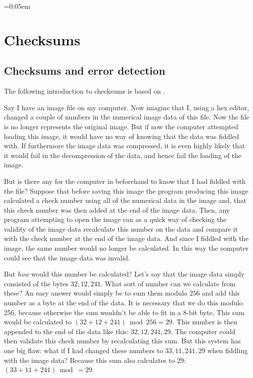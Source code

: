 \begin{comment}
  
\end{comment}

\begingroup
\arraycolsep=0.05em

\chapter{Checksums}
\label{cha:crc}

\section{Checksums and error detection}

The following introduction to checksums is based on
\cite{Williams_1993_crc_painless,barr:_addit_check,tanenbaum2003computernetworks_crc,Nelson:1992:FVU:135011.135017_crc32}.

Say I have an image file on my computer. Now imagine that I, using a
hex editor, changed a couple of numbers in the numerical image data of
this file. Now the file is no longer represents the original
image. But if now the computer attempted loading this image, it would
have no way of knowing that the data was fiddled with. If furthermore
the image data was compressed, it is even highly likely that it would
fail in the decompression of the data, and hence fail the loading of
the image.

But is there any for the computer in beforehand to know that I had
fiddled with the file? Suppose that before saving this image the
program producing this image calculated a check number using all of
the numerical data in the image and, that this check number was then
added at the end of the image data. Then, any program attempting to
open the image can as a quick way of checking the validity of the
image data recalculate this number on the data and compare it with the
check number at the end of the image data. And since I fiddled with
the image, the same number would no longer be calculated. In this way
the computer could see that the image data was invalid.

But \textit{how} would this number be calculated? Let's say that the
image data simply consisted of the bytes $32,12,241$. What sort of
number can we calculate from these? An easy answer would simply be to
sum them modulo $256$ and add this number as a byte at the end of the
data. It is necessary that we do this modulo 256, because otherwise
the sum wouldn't be able to fit in a 8-bit byte. This sum would be
calculated to $(32 + 12 + 241) \bmod 256 = 29$. This number is then
appended to the end of the data like this: $32,12,241,29$. The
computer could then validate this check number by recalculating this
sum. But this system has one big flaw: what if I had changed these
numbers to $33,11,241, 29$ when fiddling with the image data?  Because
this sum also calculates to 29: $(33 + 11 + 241) \bmod = 29$.

